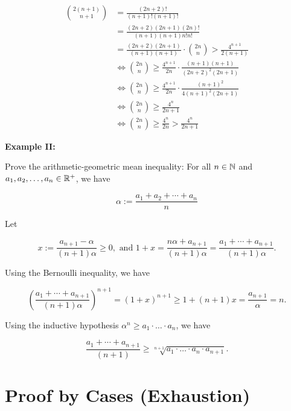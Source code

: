 \begin{align*}
	\binom{2(n + 1)}{n + 1} & = \frac{(2n + 2)!}{(n + 1)!(n + 1)!}                                                        \\
	                        & = \frac{(2n + 2)(2n + 1)(2n)!}{(n + 1)(n + 1)n!n!}                                          \\
	                        & = \frac{(2n + 2)(2n + 1)}{(n + 1)(n + 1)} \cdot \binom{2n}{n} > \frac{4^{n + 1}}{2(n + 1)}  \\
	                        & \iff \binom{2n}{n} \ge \frac{4^{n + 1}}{2n} \cdot \frac{(n + 1)(n + 1)}{(2n + 2)^2(2n + 1)} \\
	                        & \iff \binom{2n}{n} \ge \frac{4^{n + 1}}{2n} \cdot \frac{(n + 1)^2}{4(n + 1)^2(2n + 1)}      \\
	                        & \iff \binom{2n}{n} \ge \frac{4^n}{2n + 1}                                                   \\
	                        & \iff \binom{2n}{n} \ge \frac{4^n}{2n} > \frac{4^n}{2n + 1}
\end{align*}

\QED

\textbf{Example II:}

Prove the arithmetic-geometric mean inequality: For all \(n \in \mathbb{N}\) and \(a_1, a_2, \dots, a_n \in \mathbb{R}^+\), we have

\[
	\alpha := \frac{a_1 + a_2 + \cdots + a_n}{n}
\]

Let

\[
	x := \frac{a_{n + 1} - \alpha}{(n + 1)\alpha} \ge 0, \text{ and } 1 + x = \frac{ n\alpha + a_{n + 1} }{(n + 1)\alpha} = \frac{a_1 + \cdots + a_{n + 1} }{(n + 1)\alpha}.
\]

Using the Bernoulli inequality, we have

\[
	\left( \frac{a_1 + \cdots + a_{n + 1} }{(n + 1)\alpha} \right)^{n + 1} = (1 + x)^{n + 1} \ge 1 + (n + 1)x = \frac{a_{n + 1}}{\alpha} = n.
\]

Using the inductive hypothesis \(\alpha^n \ge a_1 \cdot \dots \cdot a_n\), we have

\[
	\frac{a_1 + \cdots + a_{n + 1} }{(n + 1)} \ge \sqrt[n + 1]{a_1 \cdot \dots \cdot a_n \cdot a_{n + 1}}.
\]

\section{Proof by Cases (Exhaustion)}


